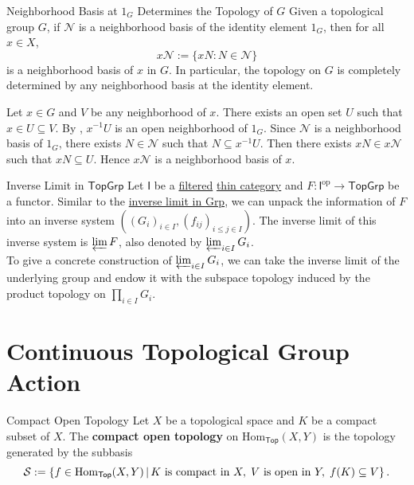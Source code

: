 \begin{proposition}{Neighborhood Basis at $1_G$ Determines the Topology of $G$}{}
    Given a topological group $G$, if $\mathcal{N}$ is a neighborhood basis of the identity element $1_G$, then for all $x \in X$, 
    \[
        x \mathcal{N}:=\{x N: N \in \mathcal{N}\}
    \] 
    is a neighborhood basis of $x$ in $G$. In particular, the topology on $G$ is completely determined by any neighborhood basis at the identity element.
\end{proposition}

\begin{prf}
    Let $x \in G$ and $V$ be any neighborhood of $x$. There exists an open set $U$ such that $x\in U\subseteq V$. By , $x^{-1} U$ is an open neighborhood of $1_G$. Since $\mathcal{N}$ is a neighborhood basis of $1_G$, there exists $N \in \mathcal{N}$ such that $N \subseteq x^{-1} U$. Then there exists $x N \in x \mathcal{N}$ such that $x N \subseteq U$. Hence $x \mathcal{N}$ is a neighborhood basis of $x$.
\end{prf}



\begin{definition}{Inverse Limit in $\mathsf{TopGrp}$}{}
    Let $\mathsf{I}$ be a \hyperref[th:filtered_category]{filtered} \hyperref[th:thin_category]{thin category} and $F:\mathsf{I}^{\mathrm{op}}\to \mathsf{TopGrp}$ be a functor. Similar to the \hyperref[th:inverse_limit_of_groups]{inverse limit in \textsf{Grp}}, we can unpack the information of $F$ into an inverse system $\left(\left(G_i\right)_{i \in I},\left(f_{i j}\right)_{i \leq j \in I}\right)$. The inverse limit of this inverse system is $\varprojlim F$, also denoted by $\varprojlim_{i\in I}G_i$.\\
    To give a concrete construction of $\varprojlim_{i\in I}G_i$, we can take the inverse limit of the underlying group and endow it with the subspace topology induced by the product topology on $\prod_{i\in I}G_i$.
\end{definition}


\section{Continuous Topological Group Action}
\begin{definition}{Compact Open Topology}{}
	Let $X$ be a topological space and $K$ be a compact subset of $X$. The \textbf{compact open topology} on $\mathrm{Hom}_{\mathsf{Top}}(X,Y)$ is the topology generated by the subbasis
	\[
		\mathcal{S}:=\left\{f\in \mathrm{Hom}_{\mathsf{Top}}(X,Y)\,\middle\vert\, K\text{ is compact in }X,\;V\text{ is open in }Y,\;f(K)\subseteq V\right\}.
	\]
\end{definition}



